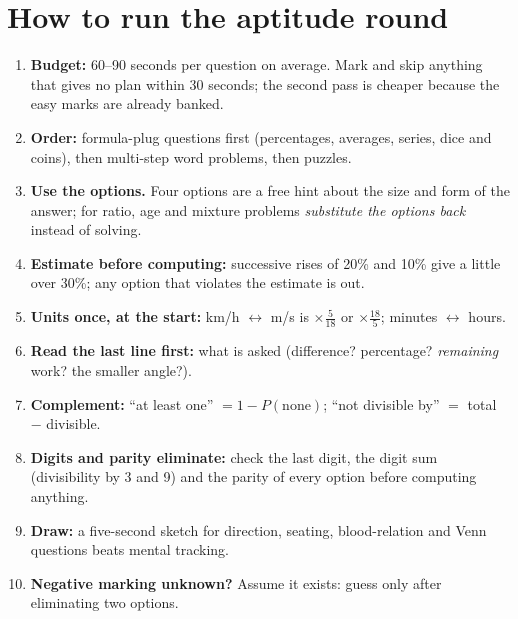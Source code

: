 \documentclass[10pt,a4paper,openany,oneside]{report}
\newcommand{\prio}[1]{\texorpdfstring{\ifcase#1\or{\color{gold}\ding{72}}\or{\color{gold}\ding{72}\ding{72}}\or{\color{gold}\ding{72}\ding{72}\ding{72}}\fi}{}}
\begin{document}
\section{How to run the aptitude round \prio{3}}
\begin{mustbox}
\begin{enumerate}[nosep,leftmargin=*]
\item \textbf{Budget:} 60--90 seconds per question on average. Mark and skip anything that gives no plan within 30 seconds; the second pass is cheaper because the easy marks are already banked.
\item \textbf{Order:} formula-plug questions first (percentages, averages, series, dice and coins), then multi-step word problems, then puzzles.
\item \textbf{Use the options.} Four options are a free hint about the size and form of the answer; for ratio, age and mixture problems \emph{substitute the options back} instead of solving.
\item \textbf{Estimate before computing:} successive rises of 20\% and 10\% give a little over 30\%; any option that violates the estimate is out.
\item \textbf{Units once, at the start:} km/h $\leftrightarrow$ m/s is $\times\frac5{18}$ or $\times\frac{18}5$; minutes $\leftrightarrow$ hours.
\item \textbf{Read the last line first:} what is asked (difference? percentage? \emph{remaining} work? the smaller angle?).
\item \textbf{Complement:} ``at least one'' $=1-P(\text{none})$; ``not divisible by'' $=$ total $-$ divisible.
\item \textbf{Digits and parity eliminate:} check the last digit, the digit sum (divisibility by 3 and 9) and the parity of every option before computing anything.
\item \textbf{Draw:} a five-second sketch for direction, seating, blood-relation and Venn questions beats mental tracking.
\item \textbf{Negative marking unknown?} Assume it exists: guess only after eliminating two options.
\end{enumerate}
\end{mustbox}
\end{document}

